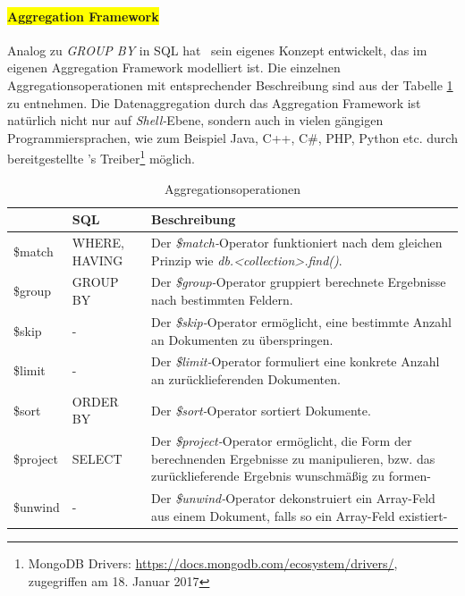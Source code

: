 \paragraph{\colorbox{yellow}{Aggregation Framework}}\label{aggrFr}

Analog zu \textit{GROUP BY} in SQL hat \mongo\ sein eigenes Konzept entwickelt, das im eigenen Aggregation Framework modelliert ist. Die einzelnen Aggregationsoperationen mit entsprechender Beschreibung sind aus der Tabelle \ref{table:aggrOperators} zu entnehmen. Die Datenaggregation durch das Aggregation Framework ist natürlich nicht nur auf \textit{Shell-}Ebene, sondern auch in vielen gängigen Programmiersprachen, wie zum Beispiel Java, C++, C\#, PHP, Python etc. durch bereitgestellte \mongo's Treiber\footnote{MongoDB Drivers: \url{https://docs.mongodb.com/ecosystem/drivers/}, zugegriffen am 18. Januar 2017} möglich.
\begin{table}[H]
\centering
\begin{tabular}{lp{2.3cm}p{10.3cm}}
\toprule 
    \rowcolor{gray!50}
	\mongo & SQL & Beschreibung\\
	\midrule
	\$match & WHERE, HAVING & Der \textit{\$match-}Operator funktioniert nach dem gleichen Prinzip wie \textit{db.<collection>.find({})}.\\
	\$group & GROUP BY & Der \textit{\$group-}Operator gruppiert berechnete Ergebnisse nach bestimmten Feldern.\\
	\$skip & - & Der \textit{\$skip-}Operator ermöglicht, eine bestimmte Anzahl an Dokumenten zu überspringen.\\
	\$limit & - & Der \textit{\$limit-}Operator formuliert eine konkrete Anzahl an zurücklieferenden Dokumenten.\\
	\$sort & ORDER BY & Der \textit{\$sort-}Operator sortiert Dokumente.\\
	\$project  & SELECT & Der \textit{\$project-}Operator ermöglicht, die Form der berechnenden Ergebnisse zu manipulieren, bzw. das zurücklieferende Ergebnis wunschmäßig zu formen-\\
	\$unwind  & - & Der \textit{\$unwind-}Operator dekonstruiert ein Array-Feld aus einem Dokument, falls so ein Array-Feld existiert-\\
	\bottomrule
\end{tabular}
\caption[Aggregationsoperationen]{Aggregationsoperationen}
\label{table:aggrOperators}
\end{table}

